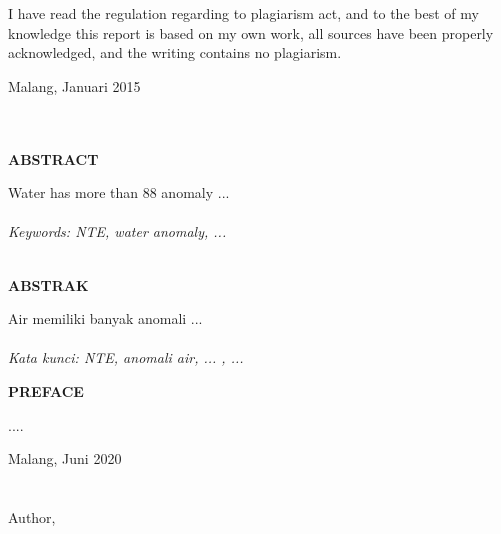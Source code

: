 	\noindent
	I have read the regulation regarding to plagiarism act, and to the best of my knowledge this report is based on my own work, all sources have been properly acknowledged, and the writing contains no plagiarism.

	\begin{center}
	Malang, Januari 2015 \\[1.75cm]
	\@author \\
	\NIM
	\end{center}	
	
\makeatother

\newpage
\makeatletter
\begin{center}
	\textbf{\@title}\\[1cm]
	\textrm{\bf ABSTRACT}
\end{center}
Water has more than 88 anomaly  ...
\\
\\ \textit{Keywords: NTE, water anomaly, ...}

\newpage

\begin{center}
	\textbf{\titleINA}\\[1cm]
	\textrm {\bf ABSTRAK}
\end{center}
Air memiliki banyak anomali ...
\\
\\ \textit{Kata kunci: NTE, anomali air, ... , ...}

\newpage

\begin{center}
	\textrm{\bf PREFACE}
\end{center}

....

\begin{minipage}[l]{0.9\textwidth}
	\raggedleft
	
	Malang, Juni 2020 \\ 
	\ \\
	\ \\
	Author,
\end{minipage}


